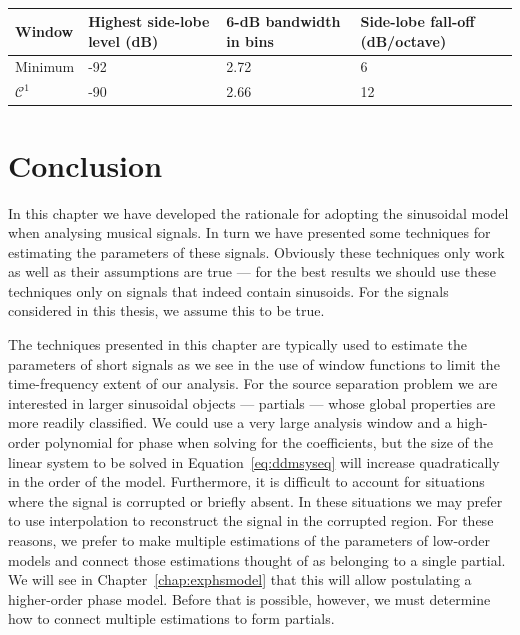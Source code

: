 \begin{table}[!b]
    \caption{\label{tab:optvs4termblackman}}
    \begin{center}
        \begin{tabular}{l p{} p{} p{}}
            Window & Highest side-lobe level (dB) & 6-dB bandwidth in bins &
            Side-lobe fall-off (dB/octave) \\
            \hline
            Minimum & -92 & 2.72 & 6 \\
            $\mathcal{C}^{1}$ & -90 & 2.66 & 12 \\
        \end{tabular}
    \end{center}
\end{table}

\section{Conclusion}

In this chapter we have developed the rationale for adopting the sinusoidal
model when analysing musical signals. In turn we have presented some techniques
for estimating the parameters of these signals. Obviously these techniques only
work as well as their assumptions are true --- for the best results we should
use these techniques only on signals that indeed contain sinusoids. For the
signals considered in this thesis, we assume this to be true.

The techniques presented in this chapter are typically used to estimate the
parameters of short signals as we see in the use of window functions to limit
the time-frequency extent of our analysis. For the source separation problem we
are interested in larger sinusoidal objects --- partials --- whose global
properties are more readily classified. We could use a very large
analysis window and a high-order polynomial for phase when solving for the
coefficients, but the size of the linear system to be solved in
Equation~\ref{eq:ddmsyseq} will increase quadratically in the order of the model.
Furthermore, it is difficult to account for situations where the signal is
corrupted or briefly absent. In these situations we may prefer to use
interpolation to reconstruct the signal in the corrupted region. For these
reasons, we prefer to make multiple estimations of the parameters of low-order
models and connect those estimations thought of as belonging to a single
partial. We will see in Chapter~\ref{chap:exphsmodel} that this will allow
postulating a higher-order phase model. Before that is possible, however, we
must determine how to connect multiple estimations to form partials.
